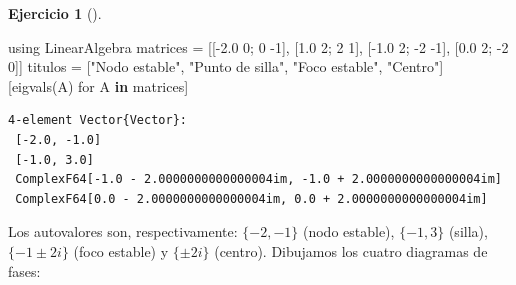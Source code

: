 \documentclass[
  spanish,
  a4paper,
]{scrreport}
\newenvironment{Shaded}{\begin{snugshade}}{\end{snugshade}}
\newcommand{\BuiltInTok}[1]{\textcolor[rgb]{0.00,0.23,0.31}{#1}}
\newcommand{\FloatTok}[1]{\textcolor[rgb]{0.68,0.00,0.00}{#1}}
\newcommand{\FunctionTok}[1]{\textcolor[rgb]{0.28,0.35,0.67}{#1}}
\newcommand{\ImportTok}[1]{\textcolor[rgb]{0.00,0.46,0.62}{#1}}
\newcommand{\KeywordTok}[1]{\textcolor[rgb]{0.00,0.23,0.31}{\textbf{#1}}}
\newcommand{\NormalTok}[1]{\textcolor[rgb]{0.00,0.23,0.31}{#1}}
\newcommand{\OperatorTok}[1]{\textcolor[rgb]{0.37,0.37,0.37}{#1}}
\newcommand{\StringTok}[1]{\textcolor[rgb]{0.13,0.47,0.30}{#1}}
\theoremstyle{definition}
\newtheorem{exercise}{Ejercicio}[chapter]
\theoremstyle{remark}
\begin{document}
\begin{exercise}[]
\begin{tcolorbox}
\begin{Shaded}
\begin{Highlighting}[]
\ImportTok{using} \BuiltInTok{LinearAlgebra}
\NormalTok{matrices }\OperatorTok{=}\NormalTok{ [[}\OperatorTok{{-}}\FloatTok{2.0} \FloatTok{0}\NormalTok{; }\FloatTok{0} \OperatorTok{{-}}\FloatTok{1}\NormalTok{], [}\FloatTok{1.0} \FloatTok{2}\NormalTok{; }\FloatTok{2} \FloatTok{1}\NormalTok{], [}\OperatorTok{{-}}\FloatTok{1.0} \FloatTok{2}\NormalTok{; }\OperatorTok{{-}}\FloatTok{2} \OperatorTok{{-}}\FloatTok{1}\NormalTok{], [}\FloatTok{0.0} \FloatTok{2}\NormalTok{; }\OperatorTok{{-}}\FloatTok{2} \FloatTok{0}\NormalTok{]]}
\NormalTok{titulos }\OperatorTok{=}\NormalTok{ [}\StringTok{"Nodo estable"}\NormalTok{, }\StringTok{"Punto de silla"}\NormalTok{, }\StringTok{"Foco estable"}\NormalTok{, }\StringTok{"Centro"}\NormalTok{]}
\NormalTok{[}\FunctionTok{eigvals}\NormalTok{(A) for A }\KeywordTok{in}\NormalTok{ matrices]}
\end{Highlighting}
\end{Shaded}

\begin{verbatim}
4-element Vector{Vector}:
 [-2.0, -1.0]
 [-1.0, 3.0]
 ComplexF64[-1.0 - 2.0000000000000004im, -1.0 + 2.0000000000000004im]
 ComplexF64[0.0 - 2.0000000000000004im, 0.0 + 2.0000000000000004im]
\end{verbatim}

Los autovalores son, respectivamente: \(\{-2,-1\}\) (nodo estable),
\(\{-1, 3\}\) (silla), \(\{-1\pm 2i\}\) (foco estable) y \(\{\pm 2i\}\)
(centro). Dibujamos los cuatro diagramas de fases:


\end{tcolorbox}
\end{exercise}
\end{document}

